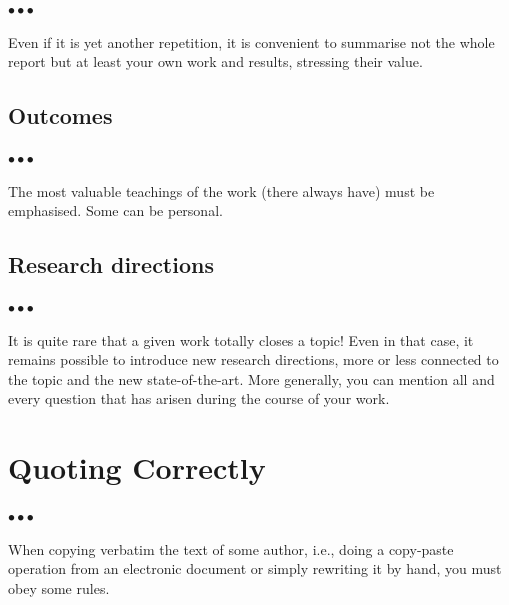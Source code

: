 \documentclass[11pt, english, screen, research-development]{report-rd-info}
\newenvironment{explanation}
{\color{blue}
 \begin{list}{}{\hspace{0.2\textwidth}\color{blue}}\item $\bullet\bullet\bullet$
}
{\end{list}}
\begin{document}
\begin{explanation}
   Even if it is yet another repetition, it is convenient to summarise not the whole report but at least your own work and results, stressing their value.
\end{explanation}

\section{Outcomes}

\begin{explanation}
   The most valuable teachings of the work (there always have) must be emphasised.
   Some can be personal.
\end{explanation}

\section{Research directions}

\begin{explanation}
   It is quite rare that a given work totally closes a topic!  Even in that case, it remains possible to introduce new research directions, more or less connected to the topic and the new state-of-the-art.
   More generally, you can mention all and every question that has arisen during the course of your work.
\end{explanation}


\nocite{*} %



\listoffigures{} %

\listoftables{} %

\listofalgorithms{} %

\appendix

\chapter{Quoting Correctly}
\label{ann:Citations}

\begin{explanation}
   When copying verbatim the text of some author, i.e., doing a copy-paste operation from an electronic document or simply rewriting it by hand, you must obey some rules.
\end{explanation}
\end{document}
